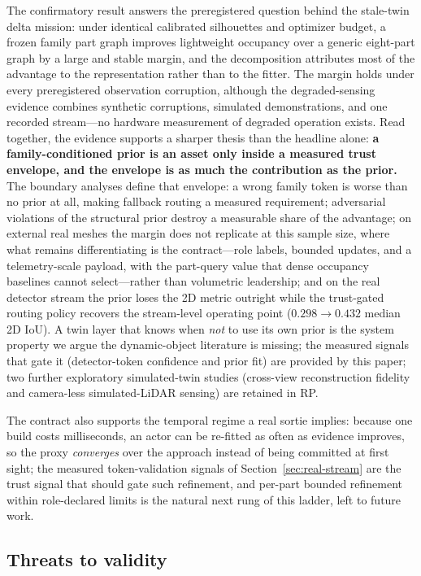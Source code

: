\documentclass[11pt,a4paper]{article}
\begin{document}
The confirmatory result answers the preregistered question behind the
stale-twin delta mission: under identical calibrated
silhouettes and optimizer budget, a frozen family part graph improves
lightweight occupancy over a generic eight-part graph by a large and stable
margin, and the decomposition attributes most of the advantage to the
representation rather than to the fitter. The margin holds under
every preregistered observation corruption, although the degraded-sensing
evidence combines synthetic corruptions, simulated demonstrations, and one
recorded stream---no hardware measurement of
degraded operation exists. Read together, the evidence supports a sharper
thesis than the headline alone: \textbf{a family-conditioned prior is an
asset only inside a measured trust envelope, and the envelope is as much the
contribution as the prior.} The boundary analyses define that envelope: a
wrong family token is worse than no prior at all, making fallback routing a
measured requirement;
adversarial violations of the structural prior destroy a measurable share of
the advantage; on external real meshes the margin does not
replicate at this sample size, where what remains differentiating is the
contract---role labels, bounded updates, and a telemetry-scale payload, with
the part-query value that dense occupancy baselines cannot
select---rather than volumetric leadership; and on the real detector stream
the prior loses the 2D metric outright while the trust-gated routing policy
recovers the stream-level operating point (\(0.298\to0.432\) median 2D IoU).
A twin layer that knows when \emph{not} to use its own prior is the system
property we argue the dynamic-object literature is missing; the measured
signals that gate it (detector-token confidence and prior fit) are provided
by this paper; two further exploratory
simulated-twin studies
(cross-view reconstruction fidelity and camera-less simulated-LiDAR sensing)
are retained in RP.

The contract also supports the temporal regime a real sortie implies:
because one build costs milliseconds, an actor can be re-fitted as often as
evidence
improves, so the proxy
\emph{converges} over the approach instead of being committed at first
sight; the measured token-validation signals of
Section~\ref{sec:real-stream} are the trust signal that should gate such
refinement, and per-part bounded refinement within role-declared limits is
the natural next rung of this ladder, left to future work.

\subsection{Threats to validity}
\label{sec:threats}
\end{document}
